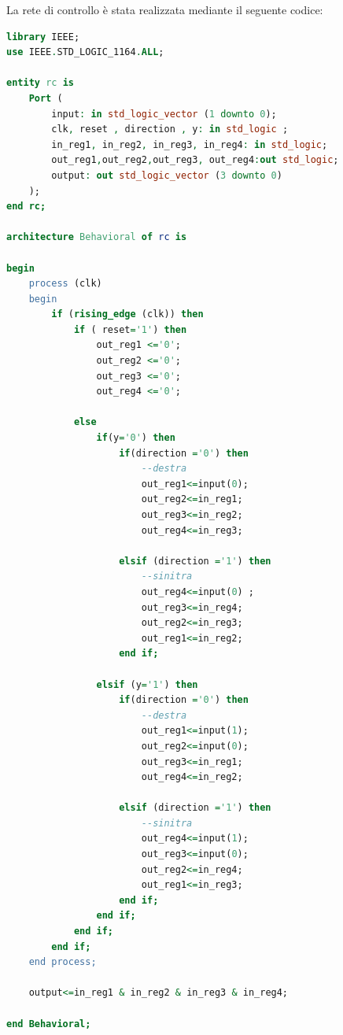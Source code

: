 La rete di controllo è stata realizzata mediante il seguente codice:

\begin{lstlisting}[language=VHDL, caption=Rete di controllo]
library IEEE;
use IEEE.STD_LOGIC_1164.ALL;

entity rc is
    Port (
        input: in std_logic_vector (1 downto 0);
        clk, reset , direction , y: in std_logic ;
        in_reg1, in_reg2, in_reg3, in_reg4: in std_logic;
        out_reg1,out_reg2,out_reg3, out_reg4:out std_logic;
        output: out std_logic_vector (3 downto 0)
    );
end rc;

architecture Behavioral of rc is

begin
    process (clk)
    begin
        if (rising_edge (clk)) then
            if ( reset='1') then
                out_reg1 <='0';
                out_reg2 <='0';
                out_reg3 <='0';
                out_reg4 <='0';

            else
                if(y='0') then
                    if(direction ='0') then
                        --destra
                        out_reg1<=input(0);
                        out_reg2<=in_reg1;
                        out_reg3<=in_reg2;
                        out_reg4<=in_reg3;

                    elsif (direction ='1') then
                        --sinitra
                        out_reg4<=input(0) ;
                        out_reg3<=in_reg4;
                        out_reg2<=in_reg3;
                        out_reg1<=in_reg2;
                    end if;

                elsif (y='1') then
                    if(direction ='0') then
                        --destra
                        out_reg1<=input(1);
                        out_reg2<=input(0);
                        out_reg3<=in_reg1;
                        out_reg4<=in_reg2;

                    elsif (direction ='1') then
                        --sinitra
                        out_reg4<=input(1);
                        out_reg3<=input(0);
                        out_reg2<=in_reg4;
                        out_reg1<=in_reg3;
                    end if;
                end if;
            end if;
        end if;
    end process;
    
    output<=in_reg1 & in_reg2 & in_reg3 & in_reg4;

end Behavioral;
\end{lstlisting}

